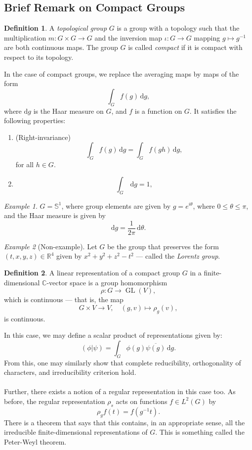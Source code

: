 \documentclass[a4paper]{report}
\theoremstyle{definition}
\newtheorem{definition}{Definition}
\theoremstyle{remark}
\theoremstyle{proposition}
\theoremstyle{conjecture}
\theoremstyle{lemma}
\theoremstyle{corollary}
\theoremstyle{exercise}
\theoremstyle{example}
\newtheorem{example}{Example}
\newcommand{\C}{\mathbb{C}}
\newcommand{\on}{\operatorname}
\begin{document}
\subsection{Brief Remark on Compact Groups}

\begin{definition}
    A \emph{topological group} $G$ is a group with a topology such that
    the multiplication $m : G \times G \to G$ and the inversion map
    $\iota : G \to G$ mapping $g\mapsto g^{-1}$ are both continuous maps.
    The group $G$ is called \emph{compact} if it is compact with respect
    to its topology.
\end{definition}
In the case of compact groups, we replace the averaging maps by maps
of the form $$\int_G f(g) \,\mathrm{d}g,$$
where $\mathrm{d}g$ is the Haar measure on $G$, and $f$ is a 
function on $G$. 
It satisfies the following properties:
\begin{enumerate}
    \item (Right-invariance) $$\int_G f(g) \,\mathrm{d}g = \int_G f(gh) \,\mathrm{d}g,$$
        for all $h \in G$.
    \item $$\int_G \,\mathrm{d} g = 1,$$
\end{enumerate}

\begin{example}
    $G = \mathbb{S}^1$, where group elements are given by 
    $g=e^{i\theta}$, where $0\leq \theta\leq\pi$, and the Haar measure 
    is given by 
    $$\mathrm{d}g = \frac{1}{2\pi} \,\mathrm{d}\theta.$$
\end{example}

\begin{example}[Non-example]
    Let $G$ be the group that preserves the form $(t,x,y,z) \in \mathbb{R}^4$ 
    given by $x^2 + y^2 + z^2 - t^2$ --- called the \emph{Lorentz group}.
\end{example}


\begin{definition}
    A linear representation of a compact group $G$ in a finite-dimensional 
    $\C$-vector space is a group homomorphism
    $$\rho : G\longrightarrow \on{GL}(V),$$ which is 
    continuous --- that is, the map 
    $$G \times V \longrightarrow V, \quad (g,v)\longmapsto \rho_g(v),$$
    is continuous.
\end{definition}

In this case, we may define a scalar product of representations given by:
$$(\phi\vert \psi) = \int_G \phi(g)\overline{\psi(g)}\,\mathrm{d}g.$$
From this, one may similarly show that complete reducibility,
orthogonality of characters, and irreducibility criterion hold.\\\\
Further, there exists a notion of a regular representation in this case too.
As before, the regular representation $\rho_s$ acts on functions 
$f\in L^2(G)$ by $$\rho_gf(t) = f(g^{-1}t).$$
There is a theorem that says that this contains, in an appropriate sense, 
all the irreducible finite-dimensional representations of $G$.
This is something called the Peter-Weyl theorem.
\end{document}
